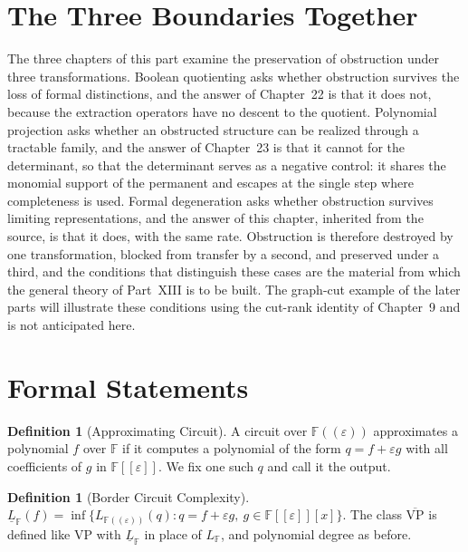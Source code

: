 \documentclass[11pt,letterpaper]{report}
\theoremstyle{plain}
\theoremstyle{definition}
\newtheorem{definition}[theorem]{Definition}
\theoremstyle{remark}
\newcommand{\VP}{\mathrm{VP}}
\begin{document}
\section{The Three Boundaries Together}

The three chapters of this part examine the preservation of obstruction under three transformations. Boolean quotienting asks whether obstruction survives the loss of formal distinctions, and the answer of Chapter~22 is that it does not, because the extraction operators have no descent to the quotient. Polynomial projection asks whether an obstructed structure can be realized through a tractable family, and the answer of Chapter~23 is that it cannot for the determinant, so that the determinant serves as a negative control: it shares the monomial support of the permanent and escapes at the single step where completeness is used. Formal degeneration asks whether obstruction survives limiting representations, and the answer of this chapter, inherited from the source, is that it does, with the same rate. Obstruction is therefore destroyed by one transformation, blocked from transfer by a second, and preserved under a third, and the conditions that distinguish these cases are the material from which the general theory of Part~XIII is to be built. The graph-cut example of the later parts will illustrate these conditions using the cut-rank identity of Chapter~9 and is not anticipated here.

\section{Formal Statements}

\begin{definition}[Approximating Circuit]\label{def:approx}
A circuit over $\mathbb F((\varepsilon))$ approximates a polynomial $f$ over $\mathbb F$ if it computes a polynomial of the form $q=f+\varepsilon g$ with all coefficients of $g$ in $\mathbb F[[\varepsilon]]$. We fix one such $q$ and call it the output.
\end{definition}

\begin{definition}[Border Circuit Complexity]
$\underline L_{\mathbb F}(f)=\inf\{L_{\mathbb F((\varepsilon))}(q):q=f+\varepsilon g,\ g\in\mathbb F[[\varepsilon]][x]\}$. The class $\overline{\VP}$ is defined like $\VP$ with $\underline L_{\mathbb F}$ in place of $L_{\mathbb F}$, and polynomial degree as before.
\end{definition}
\end{document}

